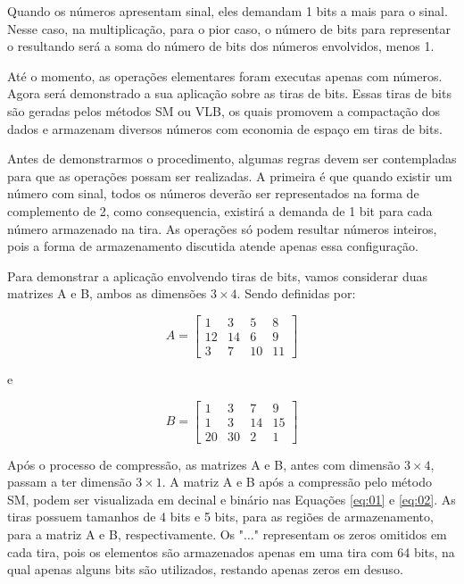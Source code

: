 \documentclass[12pt]{article}
\begin{document}
Quando os números apresentam sinal, eles demandam 1 bits a mais para o sinal.
Nesse caso, na multiplicação, para o pior caso, o número de bits para
representar o resultando será a soma do número de bits dos números envolvidos,
menos 1.

Até o momento, as operações elementares foram executas apenas com números. Agora
será demonstrado a sua aplicação sobre as tiras de bits. Essas tiras de bits são
geradas pelos métodos SM ou VLB, os quais promovem a compactação dos dados e
armazenam diversos números com economia de espaço em tiras de bits.  

Antes de demonstrarmos o procedimento, algumas regras devem ser contempladas
para que as operações possam ser realizadas. A primeira é que quando existir um
número com sinal, todos os números deverão ser representados na forma de
complemento de 2, como consequencia, existirá a demanda de 1 bit para cada
número armazenado na tira. As operações só podem resultar números inteiros, pois
a forma de armazenamento discutida atende apenas essa configuração.

Para demonstrar a aplicação envolvendo tiras de bits, vamos considerar duas
matrizes A e B, ambos as dimensões $3 \times 4$. Sendo definidas por:

\begin{equation}
	A = \begin{bmatrix}
			1 & 3 & 5 & 8\\ 
			12 &14  & 6 & 9\\ 
			3 & 7 & 10 & 11
		\end{bmatrix}
\end{equation}

e

\begin{equation}
	B = \begin{bmatrix}
			1  & 3  & 7 & 9\\ 
			1  &3   & 14 & 15\\ 
			20 & 30 & 2 & 1
		\end{bmatrix}
\end{equation}

Após o processo de compressão, as matrizes A e B, antes com dimensão $3 \times
4$, passam a ter dimensão $3 \times 1$. A matriz A e B após a compressão pelo
método SM, podem ser visualizada em decinal e binário nas Equações \ref{eq:01} e
\ref{eq:02}. As tiras possuem tamanhos de 4 bits e 5 bits, para as regiões de
armazenamento, para a matriz A e B, respectivamente. Os "$\ldots$" representam
os zeros omitidos em cada tira, pois os elementos são armazenados apenas em uma
tira com 64 bits, na qual apenas alguns bits são utilizados, restando apenas
zeros em desuso.
\end{document}

